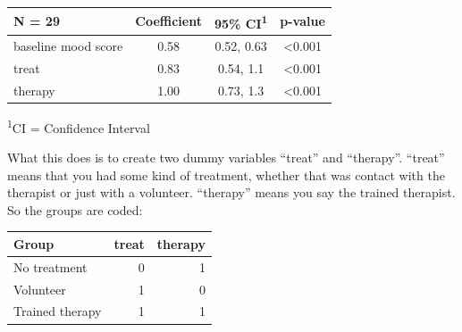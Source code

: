 \documentclass[]{book}
\newenvironment{Shaded}{\begin{snugshade}}{\end{snugshade}}
\newcommand{\DataTypeTok}[1]{\textcolor[rgb]{0.13,0.29,0.53}{#1}}
\newcommand{\DecValTok}[1]{\textcolor[rgb]{0.00,0.00,0.81}{#1}}
\newcommand{\KeywordTok}[1]{\textcolor[rgb]{0.13,0.29,0.53}{\textbf{#1}}}
\newcommand{\NormalTok}[1]{#1}
\newcommand{\OperatorTok}[1]{\textcolor[rgb]{0.81,0.36,0.00}{\textbf{#1}}}
\newcommand{\StringTok}[1]{\textcolor[rgb]{0.31,0.60,0.02}{#1}}
\begin{document}
\begin{Shaded}
\end{Shaded}

\captionsetup[table]{labelformat=empty,skip=1pt}
\begin{longtable}{lccc}
\toprule
\textbf{N = 29} & \textbf{Coefficient} & \textbf{95\% CI}\textsuperscript{1} & \textbf{p-value} \\ 
\midrule
baseline mood score & 0.58 & 0.52, 0.63 & <0.001 \\ 
treat & 0.83 & 0.54, 1.1 & <0.001 \\ 
therapy & 1.00 & 0.73, 1.3 & <0.001 \\ 
\bottomrule
\end{longtable}
\vspace{-5mm}
\begin{minipage}{\linewidth}
\textsuperscript{1}CI = Confidence Interval \\ 
\end{minipage}

What this does is to create two dummy variables ``treat'' and
``therapy''. ``treat'' means that you had some kind of treatment,
whether that was contact with the therapist or just with a volunteer.
``therapy'' means you say the trained therapist. So the groups are
coded:

\captionsetup[table]{labelformat=empty,skip=1pt}
\begin{longtable}{lrr}
\toprule
Group & treat & therapy \\ 
\midrule
No treatment & 0 & 1 \\ 
Volunteer & 1 & 0 \\ 
Trained therapy & 1 & 1 \\ 
\bottomrule
\end{longtable}
\end{document}
